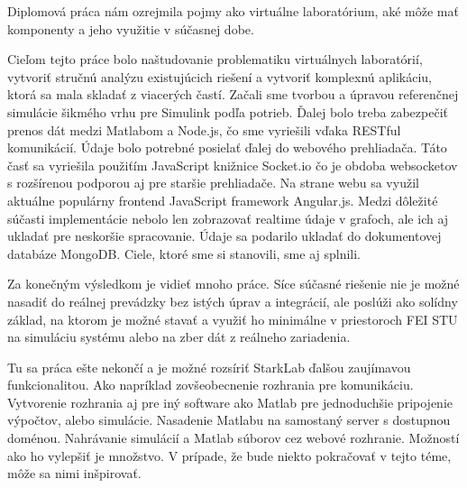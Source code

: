 \indent Diplomová práca nám ozrejmila pojmy ako virtuálne laboratórium, aké môže mať komponenty a jeho využitie v súčasnej dobe.

Cieľom tejto práce bolo naštudovanie problematiku virtuálnych laboratórií, vytvoriť stručnú analýzu existujúcich riešení a vytvoriť komplexnú aplikáciu, ktorá sa mala skladať z viacerých častí. Začali sme tvorbou a úpravou referenčnej simulácie šikmého vrhu pre Simulink podľa potrieb. Ďalej bolo treba zabezpečiť prenos dát medzi Matlabom a Node.js, čo sme vyriešili vďaka RESTful komunikácií. Údaje bolo potrebné posielať ďalej do webového prehliadača. Táto časť sa vyriešila použiťím JavaScript knižnice Socket.io čo je obdoba websocketov s rozšírenou podporou aj pre staršie prehliadače. Na strane webu sa využil aktuálne populárny frontend JavaScript framework Angular.js. Medzi dôležité súčasti implementácie nebolo len zobrazovať realtime údaje v grafoch, ale ich aj ukladať pre neskoršie spracovanie. Údaje sa podarilo ukladať do dokumentovej databáze MongoDB.
Ciele, ktoré sme si stanovili, sme aj splnili.

Za konečným výsledkom je vidieť mnoho práce. Síce súčasné riešenie nie je možné nasadiť do reálnej prevádzky bez istých úprav a integrácií, ale poslúži ako solídny základ, na ktorom je možné stavať a využiť ho minimálne v priestoroch FEI STU na simuláciu systému alebo na zber dát z reálneho zariadenia.

Tu sa práca ešte nekončí a je možné rozsíriť StarkLab ďalšou zaujímavou funkcionalitou. Ako napríklad zovšeobecnenie rozhrania pre komunikáciu. Vytvorenie rozhrania aj pre iný software ako Matlab pre jednoduchšie pripojenie výpočtov, alebo simulácie. Nasadenie Matlabu na samostaný server s dostupnou doménou. Nahrávanie simulácií a Matlab súborov cez webové rozhranie. Možností ako ho vylepšiť je množstvo. V prípade, že bude niekto pokračovať v tejto téme, môže sa nimi inšpirovať.